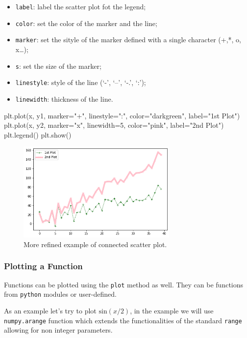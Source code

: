\begin{ipython}
\begin{itemize}
	\tightlist
	\item
	\texttt{label}: label the scatter plot fot the legend;
	\item
	\texttt{color}: set the color of the marker and the line;
	\item
	\texttt{marker}: set the sityle of the marker defined with a single
	character (+,*, o, x\ldots{});
	\item
	\texttt{s}: set the size of the marker;
	\item
	\texttt{linestyle}: style of the line (`-', `--', `-.', `:');
	\item
	\texttt{linewidth}: thickness of the line.
\end{itemize}

\begin{ipython}
plt.plot(x, y1, marker="+", linestyle=":", color="darkgreen", label="1st Plot")
plt.plot(x, y2, marker="x", linewidth=5, color="pink", label="2nd Plot")
plt.legend()
plt.show()
\end{ipython}

\begin{figure}[htb]
	\centering
	\includegraphics[width=0.7\textwidth]{figures/plot2}
	\caption{More refined example of connected scatter plot.}
	\label{fig:plot2}
\end{figure}

\subsubsection{Plotting a Function}\label{plotting-a-function}

Functions can be plotted using the \texttt{plot} method as well. They can be
functions from \texttt{python} modules or user-defined.

As an example let's try to plot \(\mathrm{sin}(x/2)\), in the example we
will use \texttt{numpy.arange} function which extends the functionalities
of the standard \texttt{range} allowing for non integer parameters.


\end{ipython}
